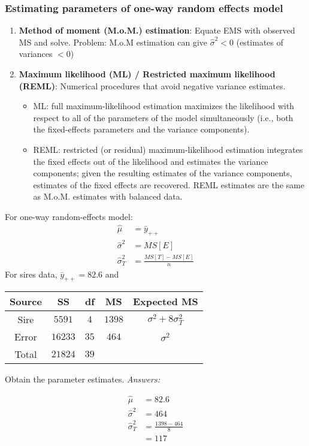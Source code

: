 \subsubsection*{Estimating parameters of one-way random effects model}
\begin{enumerate}
	\item {\bf Method of moment (M.o.M.) estimation}: Equate EMS with observed MS and solve. Problem: M.o.M estimation can give $\hat{\sigma}^2 < 0$ (estimates of variances $<0$)
	\item {\bf Maximum likelihood (ML) / Restricted maximum likelihood (REML)}: Numerical procedures that avoid negative variance estimates.
	    \begin{itemize}
	    	\item ML:  full maximum-likelihood estimation maximizes the likelihood with respect to all of the parameters of the model simultaneously (i.e., both the fixed-effects parameters and the variance components).
	    	\item REML: restricted (or residual) maximum-likelihood estimation integrates the fixed effects out of the likelihood and estimates the variance components; given the resulting estimates of the variance components, estimates of the fixed effects are recovered.
	    	REML estimates are the same as M.o.M. estimates with balanced data.
	    \end{itemize}
\end{enumerate}


For one-way random-effects model:
$$
\begin{aligned}
	\hat{\mu} &= \bar{y}_{++}\\
	\hat{\sigma}^2 &= MS[E]\\
	\hat{\sigma}^2_T &= \frac{MS[T] - MS[E]}{n}
\end{aligned}
$$
For sires data, $\bar{y}_{++} = 82.6$ and 
\begin{table}[H]
	\renewcommand{\arraystretch}{1.5}
	\centering
	\begin{tabular}{ccccc}
		\toprule
		Source & SS & df & MS & Expected MS \\
		\hline
		Sire & $5591$ & $4$ & $1398$ & $\sigma^2 + 8\sigma^2_T$\\
		Error & $16233$ & $35$ & $464$ & $\sigma^2$\\
		Total & $21824$ & $39$ &  &\\
		\bottomrule
	\end{tabular}
\end{table}

Obtain the parameter estimates.
{\it Answers:}\\
\begin{pf}
	$$
	\begin{aligned}
		\hat{\mu} &= 82.6\\
		\hat{\sigma}^2 &= 464\\
		\hat{\sigma}_T^2 &= \frac{1398-464}{8}\\
		&= 117\\
	\end{aligned}
	$$
\end{pf}
